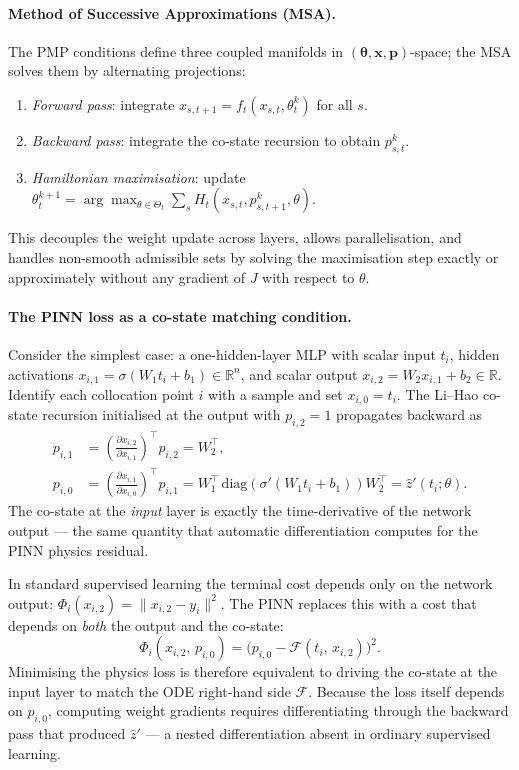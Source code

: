 \documentclass{article}
\begin{document}
\paragraph{Method of Successive Approximations (MSA).}
The PMP conditions define three coupled manifolds in
$(\boldsymbol\theta,\mathbf{x},\mathbf{p})$-space; the MSA solves them by
alternating projections:
\begin{enumerate}
    \item \emph{Forward pass}: integrate $x_{s,t+1}=f_t(x_{s,t},\theta_t^k)$
          for all $s$.
    \item \emph{Backward pass}: integrate the co-state recursion to obtain
          $p_{s,t}^k$.
    \item \emph{Hamiltonian maximisation}: update
          $\theta_t^{k+1}=\arg\max_{\theta\in\Theta_t}\sum_s
          H_t(x_{s,t},p_{s,t+1}^k,\theta)$.
\end{enumerate}
This decouples the weight update across layers, allows parallelisation, and
handles non-smooth admissible sets by solving the maximisation step exactly or
approximately without any gradient of $J$ with respect to $\theta$.

\paragraph{The PINN loss as a co-state matching condition.}
Consider the simplest case: a one-hidden-layer MLP with scalar input $t_i$,
hidden activations $x_{i,1}=\sigma(W_1 t_i+b_1)\in\mathbb{R}^n$, and scalar
output $x_{i,2}=W_2 x_{i,1}+b_2\in\mathbb{R}$.  Identify each collocation
point $i$ with a sample and set $x_{i,0}=t_i$.  The Li--Hao co-state
recursion initialised at the output with $p_{i,2}=1$ propagates backward as
\begin{align}
    p_{i,1} &= \left(\frac{\partial x_{i,2}}{\partial x_{i,1}}\right)^{\!\top}
               p_{i,2} = W_2^{\top}, \\[4pt]
    p_{i,0} &= \left(\frac{\partial x_{i,1}}{\partial x_{i,0}}\right)^{\!\top}
               p_{i,1}
             = W_1^{\top}\,\mathrm{diag}\!\left(\sigma'(W_1 t_i+b_1)\right)W_2^{\top}
             = \hat{z}'(t_i;\theta).
\end{align}
The co-state at the \emph{input} layer is exactly the time-derivative of the
network output — the same quantity that automatic differentiation computes for
the PINN physics residual.

In standard supervised learning the terminal cost depends only on the network
output: $\Phi_i(x_{i,2})=\|x_{i,2}-y_i\|^2$.  The PINN replaces this with a
cost that depends on \emph{both} the output and the co-state:
\begin{equation}
    \Phi_i\!\left(x_{i,2},\,p_{i,0}\right)
    = \bigl(p_{i,0} - \mathcal{F}(t_i,\,x_{i,2})\bigr)^2.
\end{equation}
Minimising the physics loss is therefore equivalent to driving the co-state at
the input layer to match the ODE right-hand side $\mathcal{F}$.  Because the
loss itself depends on $p_{i,0}$, computing weight gradients requires
differentiating through the backward pass that produced $\hat{z}'$ — a nested
differentiation absent in ordinary supervised learning.
\end{document}
